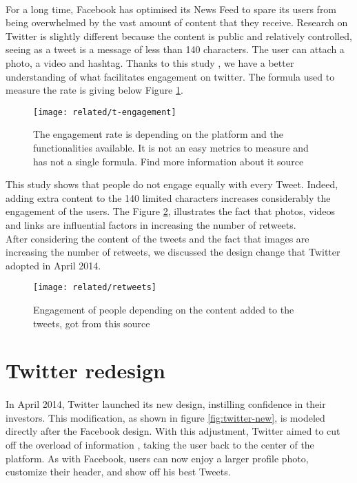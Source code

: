 \paragraph{}
For a long time, Facebook has optimised its News Feed to spare its users from being overwhelmed by the vast amount of content that they receive. Research on Twitter is slightly different because the content is public and relatively controlled, seeing as a tweet is a message of less than 140 characters. The user can attach a photo, a video and hashtag. Thanks to this study \cite{t_fuel}, we have a better understanding of what facilitates engagement on twitter. The formula used to measure the rate is giving below Figure \ref{fig:t-engagement}.

\begin{figure}[h] 
\centering 
\texttt{[image: related/t-engagement]} 
\caption[Twitter engagement rate]{The engagement rate is depending on the platform and the functionalities available. It is not an easy metrics to measure and has not a single formula. Find more information about it source \cite{f_t_engag_rates}}
\label{fig:t-engagement}
\end{figure}

This study shows that people do not engage equally with every Tweet. Indeed, adding extra content to the 140 limited characters increases considerably the engagement of the users. The Figure \ref{fig:t-retweets}, illustrates the fact that photos, videos and links are influential factors in increasing the number of retweets. \\
After considering the content of the tweets and the fact that images are increasing the number of retweets, we discussed the design change that Twitter adopted in April 2014.

\begin{figure}[h] 
\centering 
\texttt{[image: related/retweets]} 
\caption[Level of retweet]{Engagement of people depending on the content added to the tweets, got from this source \cite{t_fuel}}
\label{fig:t-retweets}
\end{figure}


\section{Twitter redesign}
\paragraph{}
In April 2014, Twitter launched its new design, instilling confidence in their investors. This modification, as shown in figure \ref{fig:twitter-new}, is modeled directly after the Facebook design.
With this adjustment, Twitter aimed to cut off the overload of information \cite{t_new_timeline}, taking the user back to the center of the platform. As with Facebook, users can now enjoy a larger profile photo, customize their header, and show off his best Tweets. 

